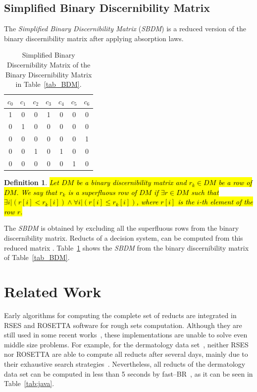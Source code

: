 \documentclass[number,preprint,review,12pt]{elsarticle}
\newtheorem{definition}{Definition}
\begin{document}
\subsection{Simplified Binary Discernibility Matrix}\label{sect_SBDM}
  The \textit{Simplified Binary Discernibility Matrix} (\textit{SBDM}) is a reduced version of the binary discernibility matrix after applying absorption laws. 
    
  \begin{table}[htb]
	\caption{Simplified Binary Discernibility Matrix of the Binary Discernibility Matrix in Table~\ref{tab_BDM}.}
	\centering
   	\begin{tabular}{ccccccc}\label{tab:SBDM1}
              $c_0$ & $c_1$ & $c_2$ & $c_3$ & $c_4$ & $c_5$ & $c_6$\\
          		\hline
          		1&0&0&1&0&0&0\\
          		0&1&0&0&0&0&0\\
          		0&0&0&0&0&0&1\\
          		0&0&1&0&1&0&0\\
          		0&0&0&0&0&1&0\\
   	\end{tabular}             
  \end{table}  
   
  \begin{definition}\label{def:basic_row}
	\hl{Let $DM$ be a binary discernibility matrix and $r_k \in DM$ be a row of $DM$. We say that $r_k$ is a superfluous row of $DM$ if $\exists r \in DM$ such that\\ $\exists i | (r[i] < r_k[i]) \wedge \forall i | (r[i] \leq r_k[i])$, where $r[i]$ is the $i$-th element of the row $r$.}

  \end{definition}

  The \textit{SBDM} is obtained by excluding all the superfluous rows from the binary discernibility matrix. Reducts of a decision system, can be computed from this reduced matrix \citep{Yao09}. Table~\ref{tab:SBDM1} shows the \textit{SBDM} from the binary discernibility matrix of Table~\ref{tab_BDM}.

 
 
\section{Related Work}\label{relatedWork}
  
  \label{early}
  Early algorithms for computing the complete set of reducts \citep{Bazan2001,Ohrn00} are integrated in RSES and ROSETTA software for rough sets computation. Although they are still used in some recent works~\cite{Stawicki2017}, %
  these implementations are unable to solve even middle size problems. For example, for the dermatology data set~\citep{Bache13}, neither RSES nor ROSETTA are able to compute all reducts after several days, mainly due to their exhaustive search strategies~\citep{Lazo15}. Nevertheless, all reducts of the dermatology data set can be computed in less than 5 seconds by fast--BR~\citep{Lias13}, as it can be seen in Table~\ref{tab:java}.
\end{document}
